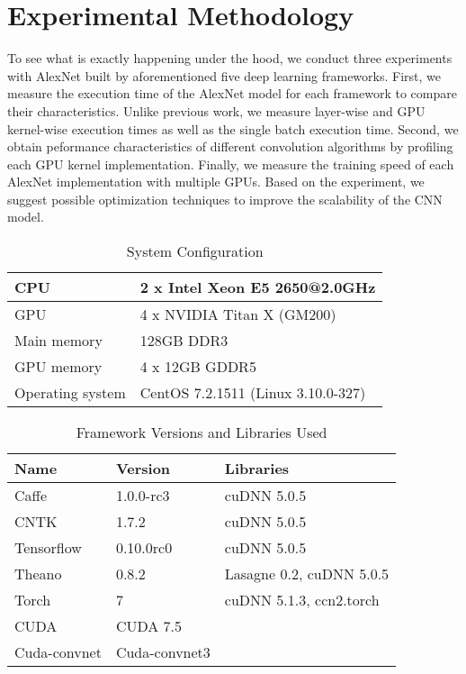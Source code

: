 \section{Experimental Methodology}
To see what is exactly happening under the hood, we conduct three experiments with AlexNet built by aforementioned five deep learning frameworks. First, we measure the execution time of the AlexNet model for each framework to compare their characteristics. Unlike previous work, we measure layer-wise and GPU kernel-wise execution times as well as the single batch execution time. Second, we obtain peformance characteristics of different convolution algorithms by profiling each GPU kernel implementation. Finally,
we measure the training speed of each AlexNet implementation with multiple GPUs. Based on the experiment, we suggest possible optimization techniques to improve the scalability of the CNN model. 

\begin{table}[]
\centering
\caption{System Configuration}
\label{table_system}
\begin{scriptsize}
\begin{tabular}{|l|l|}
\hline\hline
CPU         & 2 x Intel Xeon E5 2650@2.0GHz \\\hline
GPU         & 4 x NVIDIA Titan X (GM200)    \\\hline
Main memory & 128GB DDR3                    \\\hline
GPU memory  & 4 x 12GB GDDR5                \\\hline
Operating system & CentOS 7.2.1511 (Linux 3.10.0-327)  \\\hline
\end{tabular}
\end{scriptsize}
\end{table}

\begin{table}[]
\centering
\caption{Framework Versions and Libraries Used}
\label{table_software}
\begin{scriptsize}
\begin{tabular}{|l|l|l|}
\hline\hline
Name & Version & Libraries \\
\hline
Caffe		& 1.0.0-rc3		        &  cuDNN 5.0.5   \\\hline
CNTK		& 1.7.2                         &  cuDNN 5.0.5    \\\hline
Tensorflow	& 0.10.0rc0     	        &  cuDNN 5.0.5    \\\hline 
Theano		& 0.8.2                         & Lasagne 0.2, cuDNN 5.0.5    \\\hline 
Torch		& 7                             & cuDNN 5.1.3, ccn2.torch \\\hline
CUDA 		& CUDA 7.5                      &    \\\hline 
Cuda-convnet    & Cuda-convnet3			&    \\\hline 
\end{tabular}
\end{scriptsize}
\end{table}

